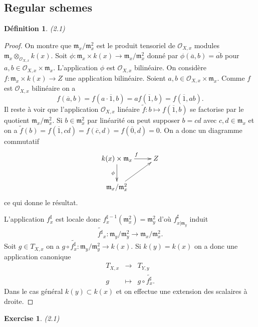 \documentclass[A4, 11pt]{article}
\newtheorem{defin}{D\'efinition}[section]
\newtheorem{exer}{Exercise}
\begin{document}
\subsection{Regular schemes}
\begin{defin}(2.1)
\end{defin} 
\begin{proof}
On montre que $\mathfrak{m}_x/\mathfrak{m}_x^2$ est le produit tensoriel de $\mathcal{O}_{X,x}$ modules $\mathfrak{m}_x \otimes_{\mathcal{O}_{X,x}} k(x)$. Soit $\phi\colon \mathfrak{m}_x\times k(x) \rightarrow \mathfrak{m}_x/\mathfrak{m}_x^2$ donné par $\phi(\overline{a},b)=\overline{ab}$ pour $a,b\in \mathcal{O}_{X,x}\times\mathfrak{m}_x$. L'application $\phi$ est $\mathcal{O}_{X,x}$ bilinéaire.
On considère $f\colon \mathfrak{m}_x\times k(x) \rightarrow Z$ une application bilinéaire. Soient $a,b\in \mathcal{O}_{X,x}\times\mathfrak{m}_x$. Comme $f$ est $\mathcal{O}_{X,x}$ bilinéaire on a $$f(\overline{a},b)=f(a\cdot \overline{1},b)=af(\overline{1},b)=f(\overline{1},ab).$$
Il reste à voir que l'application $\mathcal{O}_{X,x}$ linéaire $\tilde{f} \colon b \mapsto f(\overline{1},b)$ se factorise par le quotient $\mathfrak{m}_x/\mathfrak{m}_x^2$. Si $b\in \mathfrak{m}_x^2$ par linéarité on peut supposer $b=cd$ avec $c,d\in \mathfrak{m}_x$ et on a $\tilde{f}(b)=f(\overline{1},cd)=f(\overline{c},d)=f(\overline{0},d)=0$. On a donc un diagramme commutatif
$$\xymatrix{
k(x)\times \mathfrak{m}_x \ar[r]^{f} \ar[d]_{\phi} & Z\\
\mathfrak{m}_x/\mathfrak{m}_x^2 \ar[ur] & \\
}$$
ce qui donne le résultat.

L'application $f^{\sharp}_x$ est locale donc $f^{\sharp -1}_x(\mathfrak{m}_x^2)=\mathfrak{m}_y^2$ d'où $f^{\sharp}_{x|\mathfrak{m}_y}$ induit 
$$\tilde{f^{\sharp}}_x\colon \mathfrak{m}_y/\mathfrak{m}_y^2 \rightarrow \mathfrak{m}_x/\mathfrak{m}_x^2.$$
Soit $g\in T_{X,x}$ on a $g\circ \tilde{f^{\sharp}_x} \colon \mathfrak{m}_y/\mathfrak{m}_y^2 \rightarrow k(x)$. Si $k(y)=k(x)$ on a donc une application canonique 
$$\begin{array}{lcl}T_{X,x} &\longrightarrow  &T_{Y,y} \\
g & \longmapsto & g\circ \tilde{f^{\sharp}_x}. 
\end{array}$$
Dans le cas général $k(y)\subset k(x)$ et on effectue une extension des scalaires à droite.
\end{proof}
\begin{exer}(2.1)
\end{exer}
\end{document}
